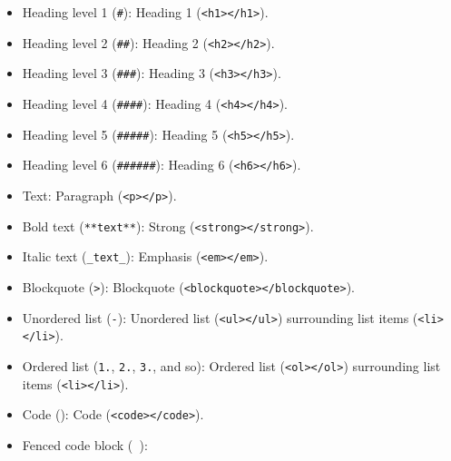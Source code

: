 \begin{itemize}
    \item
    Heading level 1 (\texttt{\#}): Heading 1
    (\texttt{\textless{}h1\textgreater{}\textless{}/h1\textgreater{}}).
    \item
    Heading level 2 (\texttt{\#\#}): Heading 2
    (\texttt{\textless{}h2\textgreater{}\textless{}/h2\textgreater{}}).
    \item
    Heading level 3 (\texttt{\#\#\#}): Heading 3
    (\texttt{\textless{}h3\textgreater{}\textless{}/h3\textgreater{}}).
    \item
    Heading level 4 (\texttt{\#\#\#\#}): Heading 4
    (\texttt{\textless{}h4\textgreater{}\textless{}/h4\textgreater{}}).
    \item
    Heading level 5 (\texttt{\#\#\#\#\#}): Heading 5
    (\texttt{\textless{}h5\textgreater{}\textless{}/h5\textgreater{}}).
    \item
    Heading level 6 (\texttt{\#\#\#\#\#\#}): Heading 6
    (\texttt{\textless{}h6\textgreater{}\textless{}/h6\textgreater{}}).
    \item
    Text: Paragraph
    (\texttt{\textless{}p\textgreater{}\textless{}/p\textgreater{}}).
    \item
    Bold text (\texttt{**text**}): Strong
    (\texttt{\textless{}strong\textgreater{}\textless{}/strong\textgreater{}}).
    \item
    Italic text (\texttt{\_text\_}): Emphasis
    (\texttt{\textless{}em\textgreater{}\textless{}/em\textgreater{}}).
    \item
    Blockquote (\texttt{\textgreater{}}): Blockquote
    (\texttt{\textless{}blockquote\textgreater{}\textless{}/blockquote\textgreater{}}).
    \item
    Unordered list (\texttt{-}): Unordered list
    (\texttt{\textless{}ul\textgreater{}\textless{}/ul\textgreater{}})
    surrounding list items
    (\texttt{\textless{}li\textgreater{}\textless{}/li\textgreater{}}).
    \item
    Ordered list (\texttt{1.}, \texttt{2.}, \texttt{3.}, and so): Ordered
    list
    (\texttt{\textless{}ol\textgreater{}\textless{}/ol\textgreater{}})
    surrounding list items
    (\texttt{\textless{}li\textgreater{}\textless{}/li\textgreater{}}).
    \item
    Code (\texttt{\textasciigrave{}\textasciigrave{}}): Code
    (\texttt{\textless{}code\textgreater{}\textless{}/code\textgreater{}}).
    \item
    Fenced code block
    (\texttt{\textasciigrave{}\textasciigrave{}\textasciigrave{}\ \textasciigrave{}\textasciigrave{}\textasciigrave{}}):

\end{itemize}
